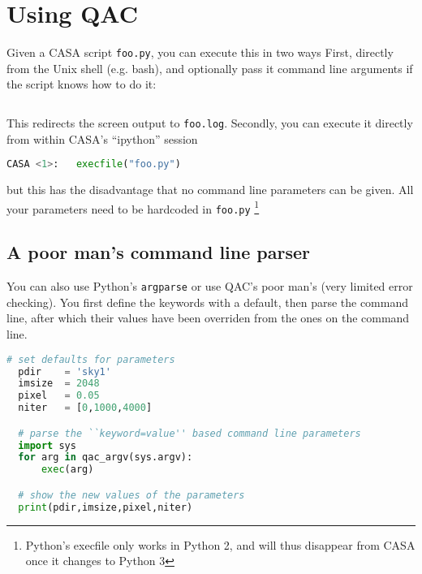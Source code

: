 \documentclass[12pt,a4paper]{article}
\begin{document}
\section{Using QAC}

Given a CASA script \verb+foo.py+, you can execute this in two ways
First, directly from the Unix shell (e.g. bash), and optionally
pass it command line arguments if the script knows how to do it:
 
\begin{lstlisting}[language=bash]
    % casa --nogui -c foo.py pixel=0.1 > foo.log 2>&1
\end{lstlisting}

This redirects the screen output to \verb+foo.log+.  Secondly, you can
execute it directly from within CASA's ``ipython'' session

\begin{lstlisting}[language=Python]
CASA <1>:   execfile("foo.py")
\end{lstlisting}

but this has the disadvantage that no command line parameters can be
given. All your parameters need to be hardcoded in
\verb+foo.py+ \footnote{Python's execfile only works in Python 2, and
  will thus disappear from CASA once it changes to Python 3}



\subsection{A poor man's command line parser}

You can also use Python's {\tt argparse} or use QAC's poor man's (very
limited error checking).  You first define the keywords with a
default, then parse the command line, after which their values have
been overriden from the ones on the command line.

\begin{lstlisting}[language=Python]
  # set defaults for parameters
  pdir    = 'sky1'
  imsize  = 2048
  pixel   = 0.05
  niter   = [0,1000,4000]

  # parse the ``keyword=value'' based command line parameters
  import sys
  for arg in qac_argv(sys.argv):   
      exec(arg)

  # show the new values of the parameters
  print(pdir,imsize,pixel,niter)

\end{lstlisting}
\end{document}
